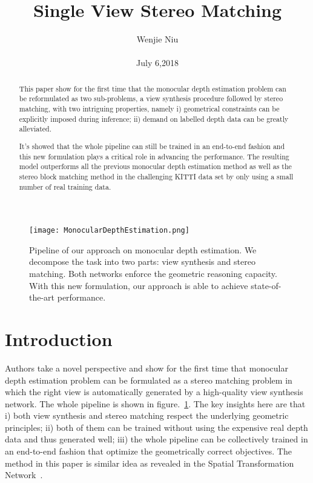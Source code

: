 \documentclass[10pt,twocolumn,letterpaper]{article}
\begin{document}
\title{Single View Stereo Matching}

\author{Wenjie Niu\\\\ July 6,2018}

\maketitle

\begin{abstract}
This paper show for the first time that the monocular depth estimation problem can be reformulated as two sub-problems, a view synthesis procedure followed by stereo matching, with two intriguing properties, namely i) geometrical constraints can be explicitly imposed during inference; ii) demand on labelled depth data can be greatly alleviated.\par
It's showed that the whole pipeline can still be trained in an end-to-end fashion and this new formulation plays a critical role in advancing the performance. The resulting model outperforms all the previous monocular depth estimation method as well as the stereo block matching method in the challenging KITTI data set by only using a small number of real training data.\par
\end{abstract}

\begin{figure}[!htp]
\begin{center}
   \texttt{[image: MonocularDepthEstimation.png]}
\end{center}
   \caption{Pipeline of our approach on monocular depth estimation. We decompose the task into two parts: view synthesis and stereo matching. Both networks enforce the geometric reasoning capacity. With this new formulation, our approach is able to achieve state-of-the-art performance.\cite{Luo_2018_CVPR}}
\label{fig:Estimation}
\end{figure}

\section{Introduction}
Authors take a novel perspective and show for the first time that monocular depth estimation problem can be formulated as a stereo matching problem in which the right view is automatically generated by a high-quality view synthesis network. The whole pipeline is shown in figure.~\ref{fig:Estimation}. The key insights here are that i) both view synthesis and stereo matching respect the underlying geometric principles; ii) both of them can be trained without using the expensive real depth data and thus generated well; iii) the whole pipeline can be collectively trained in an end-to-end fashion that optimize the geometrically correct objectives. The method in this paper is similar idea as revealed in the Spatial Transformation Network~\cite{NIPS2015_5854}.\par
\end{document}
